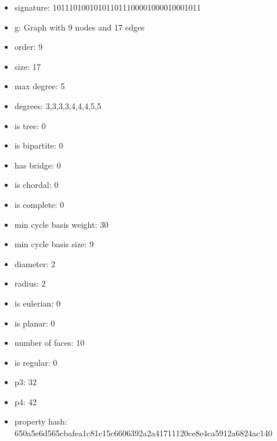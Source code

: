 \newpage
\begin{figure}
\end{figure}
\begin{itemize}
\item signature: 101110100101011011100001000010001011
\item g: Graph with 9 nodes and 17 edges
\item order: 9
\item size: 17
\item max degree: 5
\item degrees: 3,3,3,3,4,4,4,5,5
\item is tree: 0
\item is bipartite: 0
\item has bridge: 0
\item is chordal: 0
\item is complete: 0
\item min cycle basis weight: 30
\item min cycle basis size: 9
\item diameter: 2
\item radius: 2
\item is eulerian: 0
\item is planar: 0
\item number of faces: 10
\item is regular: 0
\item p3: 32
\item p4: 42
\item property hash: 650a5e6d565cbafea1c81c15c6606392a2a41711120ce8e4ca5912a6824ac140
\end{itemize}
